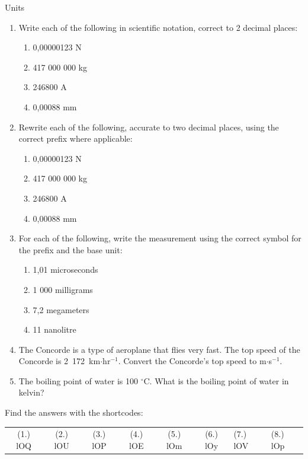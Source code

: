 \begin{eocexercises}{Units}
\begin{enumerate}[noitemsep, label=\textbf{\arabic*}. ]
\begin{enumerate}[noitemsep, label=\textbf{\alph*}. ]
\end{enumerate}
                \label{m30853*uid78}\item Write each of the following in scientific notation, correct to 2 decimal places:
\label{m30853*id68302}\begin{enumerate}[noitemsep, label=\textbf{\alph*}. ] 
            \label{m30853*uid79}\item 0,00000123 N
\label{m30853*uid80}\item 417 000 000 kg
\label{m30853*uid81}\item 246800 A
\label{m30853*uid82}\item 0,00088 mm
\end{enumerate}
                \label{m30853*uid83}\item Rewrite each of the following, accurate to two decimal places, using the correct prefix where applicable:
\label{m30853*id68367}\begin{enumerate}[noitemsep, label=\textbf{\alph*}. ] 
            \label{m30853*uid84}\item 0,00000123 N
\label{m30853*uid85}\item 417 000 000 kg
\label{m30853*uid86}\item 246800 A
\label{m30853*uid87}\item 0,00088 mm
\end{enumerate}
                \label{m30853*uid88}\item For each of the following, write the measurement using the correct symbol for the prefix and the base unit:
\label{m30853*id68433}\begin{enumerate}[noitemsep, label=\textbf{\alph*}. ] 
            \label{m30853*uid89}\item 1,01 microseconds
\label{m30853*uid90}\item 1 000 milligrams
\label{m30853*uid91}\item 7,2 megameters
\label{m30853*uid92}\item 11 nanolitre
\end{enumerate}
                \label{m30853*uid93}\item The Concorde is a type of aeroplane that flies very fast. The top speed of the Concorde is 2~172~km$\ensuremath{\cdot}$hr${}^{-1}$. Convert the Concorde's top speed to m$\ensuremath{\cdot}$s${}^{-1}$.        
\label{m30853*uid94}\item The boiling point of water is 100 ${}^{\circ }$C. What is the boiling point of water in kelvin?        
\end{enumerate}
  \label{m30853**end}
\par {} Find the answers with the shortcodes:
 \par \begin{tabular}[h]{cccccc}
 (1.) lOQ  &  (2.) lOU  &  (3.) lOP  &  (4.) lOE  &  (5.) lOm  &  (6.) lOy  &  (7.) lOV  &  (8.) lOp  & \end{tabular}
\end{eocexercises}
